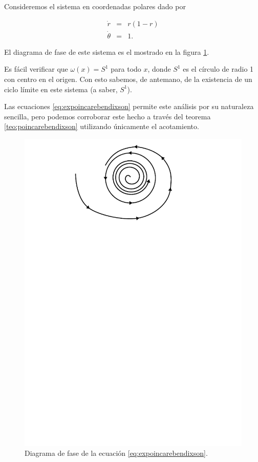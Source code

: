 \begin{example} \label{ex:poincarebendixson}
Consideremos el sistema en coordenadas polares dado por

\begin{equation} \label{eq:expoincarebendixson}
	\begin{array}{lll}
		\dot{r} & = & r(1-r) \\
		\dot{\theta} & = & 1.
	\end{array}
\end{equation}

El diagrama de fase de este sistema es el mostrado en la figura \ref{fig:expoincarebendixson}.

Es fácil verificar que $\omega(x) = S^1$ para todo $x$, donde $S^1$ es el círculo de radio 1 con centro en el origen. Con esto sabemos, de antemano, de la existencia de un ciclo límite en este sistema (a saber, $S^1$).

Las ecuaciones \ref{eq:expoincarebendixson} permite este análisis por su naturaleza sencilla, pero podemos corroborar este hecho a través del teorema \ref{teo:poincarebendixson} utilizando únicamente el acotamiento.

\begin{figure}[!htb] \centering
	\includegraphics[scale=1.1]{figures/expoincarebendixson.pdf}
	\caption{Diagrama de fase de la ecuación \ref{eq:expoincarebendixson}.}
	\label{fig:expoincarebendixson}
\end{figure}


\end{example}
